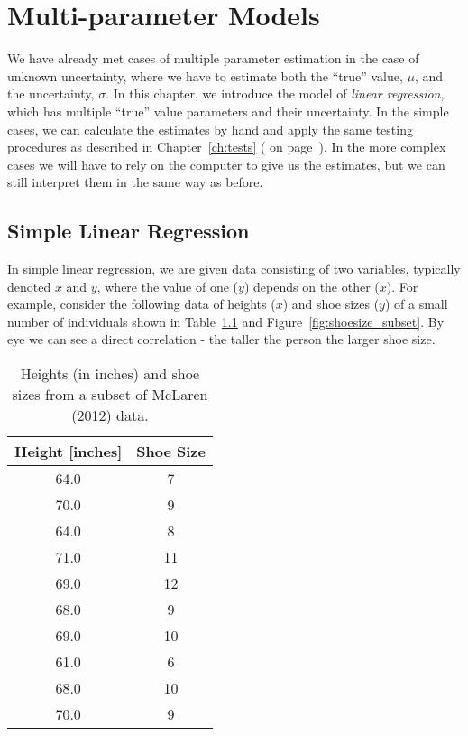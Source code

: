 \chapter{Multi-parameter Models}\label{ch:multiparam}

We have already met cases of multiple parameter estimation in the case of unknown uncertainty, where we have to estimate both the ``true'' value, $\mu$, and the uncertainty, $\sigma$.  In this chapter, we introduce the model of {\em linear regression}, which has multiple ``true'' value parameters and their uncertainty.  In the simple cases, we can calculate the estimates by hand and apply the same testing procedures as described in Chapter~\ref{ch:tests} (\emph{} on page~\pageref{ch:tests}).  In the more complex cases we will have to rely on the computer to give us the estimates, but we can still interpret them in the same way as before.

\section{Simple Linear Regression}

In simple linear regression, we are given data consisting of two variables, typically denoted $x$ and $y$, where the value of one ($y$) depends on the other ($x$).  For example, consider the following data of heights ($x$) and shoe sizes ($y$) of a small number of individuals\cite{mclaren2012using} shown in Table~\ref{tbl:shoesize_subset} and Figure~\ref{fig:shoesize_subset}.  By eye we can see a direct correlation - the taller the person the larger shoe size.  

\begin{table}
\begin{center}
\begin{tabular}{cc}
Height [inches] & Shoe Size \\ \hline\hline
64.0 & 7\\
70.0 & 9\\
64.0 & 8\\
71.0 & 11\\
69.0 & 12\\
68.0 & 9\\
69.0 & 10\\
61.0 & 6\\
68.0 & 10\\
70.0 & 9
\end{tabular}
\end{center}
\label{tbl:shoesize_subset}
\caption{Heights (in inches) and shoe sizes from a subset of McLaren (2012) data.}
\end{table}

